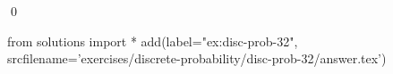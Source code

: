 
\begin{ex} 
  \label{ex:disc-prob-32}
  
  \qed
\end{ex} 
\begin{python0}
from solutions import *
add(label="ex:disc-prob-32",
    srcfilename='exercises/discrete-probability/disc-prob-32/answer.tex') 
\end{python0}
